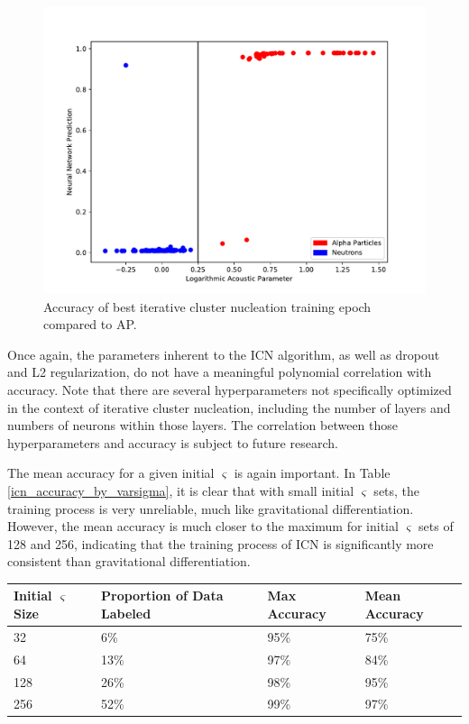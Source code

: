 \documentclass[10pt]{article}
\begin{document}
\begin{figure}[h]
    \centering
    \includegraphics[width=\textwidth]{icn_grid_search}
    \caption{\label{icn_grid_search} Accuracy of best iterative cluster nucleation training epoch compared to AP.}
\end{figure}

Once again, the parameters inherent to the ICN algorithm, as well as dropout and L2 regularization, do not have a meaningful polynomial correlation with accuracy. Note that there are several hyperparameters not specifically optimized in the context of iterative cluster nucleation, including the number of layers and numbers of neurons within those layers. The correlation between those hyperparameters and accuracy is subject to future research.

The mean accuracy for a given initial $\varsigma$ is again important. In Table \ref{icn_accuracy_by_varsigma}, it is clear that with small initial $\varsigma$ sets, the training process is very unreliable, much like gravitational differentiation. However, the mean accuracy is much closer to the maximum for initial $\varsigma$ sets of 128 and 256, indicating that the training process of ICN is significantly more consistent than gravitational differentiation.

\begin{minipage}{\textwidth}
    \begin{center}
         \label{icn_accuracy_by_varsigma}
        \begin{tabular}{|l|l|l|l|}
            \hline
            Initial $\varsigma$ Size & Proportion of Data Labeled & Max Accuracy & Mean Accuracy \\
            \hline
            32 & 6\% & 95\% & 75\% \\
            \hline
            64 & 13\% & 97\% & 84\% \\
            \hline
            128 & 26\% & 98\% & 95\% \\
            \hline
            256 & 52\% & 99\% & 97\% \\
            \hline
        \end{tabular}
    \end{center}
\end{minipage}
\end{document}
